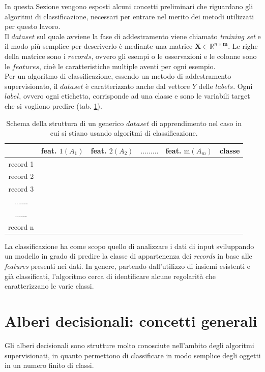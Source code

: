 In questa Sezione vengono esposti alcuni concetti preliminari che riguardano gli algoritmi di classificazione, necessari per entrare nel merito dei metodi utilizzati per questo lavoro.\\
Il $dataset$ sul quale avviene la fase di addestramento viene chiamato \textit{training set} e il modo più semplice per descriverlo è mediante una matrice $\mathbf{X} \in \mathbb{R}^{n \times \mathbf{m}}$. Le righe della matrice sono i $records$, ovvero gli esempi o le osservazioni e le colonne sono le $features$, cioè le caratteristiche multiple aventi per ogni esempio.\\
Per un algoritmo di classificazione, essendo un metodo di addestramento supervisionato, il $dataset$ è caratterizzato anche dal vettore $Y$ delle $labels$. Ogni $label$, ovvero ogni etichetta, corrisponde ad una classe e sono le variabili target che si vogliono predire (tab. \ref{tab:dataset}).\\

\begin{table}[ht]
    \centering
\begin{tabular}{|c|c|c|c|c|c|}
\hline & feat. $1\left(A_{1}\right)$ & feat. $2\left(A_{2}\right)$ & $\ldots \ldots \ldots$ & feat. $\mathrm{m}\left(A_{m}\right)$ & classe \\
\hline record 1 & & & & & \\
\hline record 2 & & & & & \\
\hline record 3 & & & & & \\
\hline$\ldots \ldots .$ & & & & & \\
\hline$\ldots \ldots$ & & & & & \\
\hline record n & & & & & \\
\hline
\end{tabular}
\caption{Schema della struttura di un generico $dataset$ di apprendimento nel caso in cui si stiano usando algoritmi di classificazione.}
\label{tab:dataset}
\end{table}

La classificazione ha come scopo quello di analizzare i dati di input sviluppando un modello in grado di predire la classe di appartenenza dei  \textit{records} in base alle \textit{features} presenti nei dati. In genere, partendo dall’utilizzo di insiemi esistenti e già classificati, l'algoritmo cerca di identificare alcune regolarità che caratterizzano le varie classi. 

\section{Alberi decisionali: concetti generali}
Gli alberi decisionali sono strutture molto conosciute nell'ambito degli algoritmi supervisionati, in quanto permettono di classificare in modo semplice degli oggetti in un numero finito di classi.

